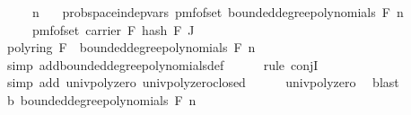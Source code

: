\begin{isabellebody}
\ \ \ {\isachardoublequoteopen}{}\ {\isasymle}\ n{\isachardoublequoteclose}\isanewline
\ \ \ {\isachardoublequoteopen}prob{\isacharunderscore}{\kern0pt}space{\isachardot}{\kern0pt}indep{\isacharunderscore}{\kern0pt}vars\ {\isacharparenleft}{\kern0pt}pmf{\isacharunderscore}{\kern0pt}of{\isacharunderscore}{\kern0pt}set\ {\isacharparenleft}{\kern0pt}bounded{\isacharunderscore}{\kern0pt}degree{\isacharunderscore}{\kern0pt}polynomials\ F\ n{\isacharparenright}{\kern0pt}{\isacharparenright}{\kern0pt}\ \isanewline
\ \ \ \ {\isacharparenleft}{\kern0pt}{\isasymlambda}{\isacharunderscore}{\kern0pt}{\isachardot}{\kern0pt}\ pmf{\isacharunderscore}{\kern0pt}of{\isacharunderscore}{\kern0pt}set\ {\isacharparenleft}{\kern0pt}carrier\ F{\isacharparenright}{\kern0pt}{\isacharparenright}{\kern0pt}\ {\isacharparenleft}{\kern0pt}hash\ F{\isacharparenright}{\kern0pt}\ J{\isachardoublequoteclose}\isanewline
%
\isadelimproof
%
\endisadelimproof
%
\isatagproof
{}\isamarkupfalse%
\ {\isacharminus}{\kern0pt}\isanewline
\ \ \isamarkupfalse%
\ {\isachardoublequoteopen}{\isasymzero}\isactrlbsub poly{\isacharunderscore}{\kern0pt}ring\ F\isactrlesub \ {\isasymin}\ bounded{\isacharunderscore}{\kern0pt}degree{\isacharunderscore}{\kern0pt}polynomials\ F\ n{\isachardoublequoteclose}\isanewline
\ \ \ \ \isamarkupfalse%
\ {\isacharparenleft}{\kern0pt}simp\ add{\isacharcolon}{\kern0pt}bounded{\isacharunderscore}{\kern0pt}degree{\isacharunderscore}{\kern0pt}polynomials{\isacharunderscore}{\kern0pt}def{\isacharparenright}{\kern0pt}\isanewline
\ \ \ \ \isamarkupfalse%
\ {\isacharparenleft}{\kern0pt}rule\ conjI{\isacharparenright}{\kern0pt}\isanewline
\ \ \ \ \ \isamarkupfalse%
\ {\isacharparenleft}{\kern0pt}simp\ add{\isacharcolon}{\kern0pt}\ univ{\isacharunderscore}{\kern0pt}poly{\isacharunderscore}{\kern0pt}zero\ univ{\isacharunderscore}{\kern0pt}poly{\isacharunderscore}{\kern0pt}zero{\isacharunderscore}{\kern0pt}closed{\isacharparenright}{\kern0pt}\isanewline
\ \ \ \ \isamarkupfalse%
\ univ{\isacharunderscore}{\kern0pt}poly{\isacharunderscore}{\kern0pt}zero\ \isamarkupfalse%
\ blast\isanewline
\ \ \isamarkupfalse%
\ b{\isacharcolon}{\kern0pt}\ {\isachardoublequoteopen}bounded{\isacharunderscore}{\kern0pt}degree{\isacharunderscore}{\kern0pt}polynomials\ F\ n\ {\isasymnoteq}\ {\isacharbraceleft}{\kern0pt}{\isacharbraceright}{\kern0pt}{\isachardoublequoteclose}\isanewline
\ \ \ \ \isamarkupfalse%

\end{isabellebody}
